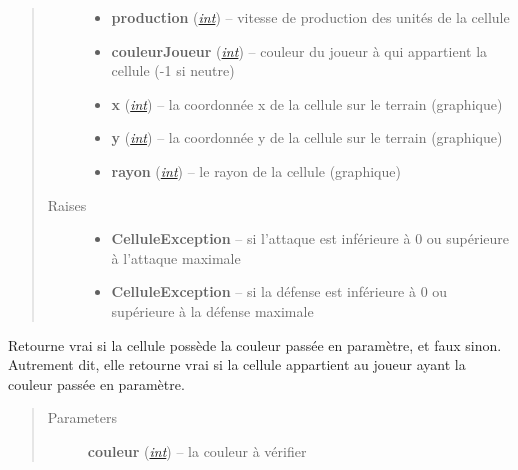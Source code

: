 \documentclass[letterpaper,10pt,english]{sphinxmanual}
\begin{document}
\begin{fulllineitems}
\begin{quote}
\begin{description}
\begin{itemize}
\item {} 
\textbf{production} (\href{http://docs.python.org/library/functions.html\#int}{\emph{int}}) -- vitesse de production des unités de la cellule

\item {} 
\textbf{couleurJoueur} (\href{http://docs.python.org/library/functions.html\#int}{\emph{int}}) -- couleur du joueur à qui appartient la cellule (-1 si neutre)

\item {} 
\textbf{x} (\href{http://docs.python.org/library/functions.html\#int}{\emph{int}}) -- la coordonnée x de la cellule sur le terrain (graphique)

\item {} 
\textbf{y} (\href{http://docs.python.org/library/functions.html\#int}{\emph{int}}) -- la coordonnée y de la cellule sur le terrain (graphique)

\item {} 
\textbf{rayon} (\href{http://docs.python.org/library/functions.html\#int}{\emph{int}}) -- le rayon de la cellule (graphique)

\end{itemize}

\item[{Raises}] \leavevmode\begin{itemize}
\item {} 
\textbf{CelluleException} -- si l'attaque est inférieure à 0 ou supérieure à l'attaque maximale

\item {} 
\textbf{CelluleException} -- si la défense est inférieure à 0 ou supérieure à la défense maximale

\end{itemize}

\end{description}\end{quote}

\begin{fulllineitems}
\label{index:Cellule.Cellule.aPourCouleur}
Retourne vrai si la cellule possède la couleur passée en paramètre, et faux sinon.
Autrement dit, elle retourne vrai si la cellule appartient au joueur ayant la couleur passée en paramètre.
\begin{quote}\begin{description}
\item[{Parameters}] \leavevmode
\textbf{couleur} (\href{http://docs.python.org/library/functions.html\#int}{\emph{int}}) -- la couleur à vérifier


\end{description}
\end{quote}
\end{fulllineitems}
\end{fulllineitems}
\end{document}
